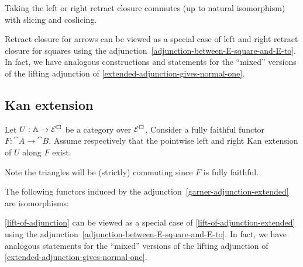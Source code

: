\documentclass[reqno,10pt,a4paper,oneside]{amsart}
\begin{document}
\begin{remark}
\label{retract-closure-extended-slicing}
Taking the left or right retract closure commutes (up to natural isomorphism) with slicing and coslicing.
\end{remark}

\begin{remark}
\label{slicing-mixed}
Retract closure for arrows can be viewed as a special case of left and right retract closure for squares using the adjunction~\eqref{adjunction-between-E-square-and-E-to}.
In fact, we have analogous constructions and statements for the ``mixed'' versions of the lifting adjunction of \cref{extended-adjunction-gives-normal-one}.
\end{remark}

\subsection{Kan extension}

Let $U : \mathbb{A} \to \mathcal{E}^{\Box}$ be a category over $\mathcal{E}^{\Box}$.
Consider a fully faithful functor $F : \cat{A} \to \cat{B}$.
Assume respectively that the pointwise left and right Kan extension of $U$ along $F$ exist.
Note the triangles will be (strictly) commuting since $F$ is fully faithful.

\begin{lemma}
\label{kan-extension-closure-extended}
The following functors induced by the adjunction~\eqref{garner-adjunction-extended} are isomorphisms:
\end{lemma}

\begin{remark}
\label{kan-extension-closure-mixed}
\cref{lift-of-adjunction} can be viewed as a special case of \cref{lift-of-adjunction-extended} using the adjunction~\eqref{adjunction-between-E-square-and-E-to}.
In fact, we have analogous statements for the ``mixed'' versions of the lifting adjunction of \cref{extended-adjunction-gives-normal-one}.
\end{remark}
\end{document}
